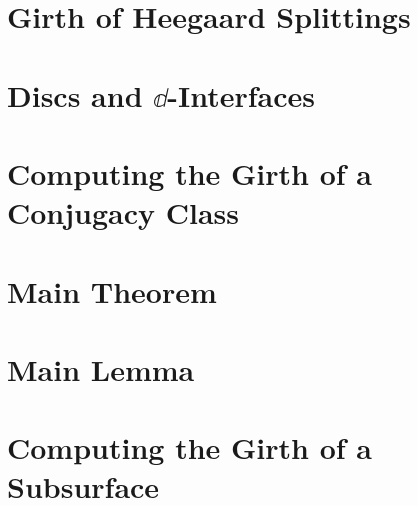 \documentclass[12pt, oneside]{amsart}
\begin{document}
\section{Girth of Heegaard Splittings}
\label{heegaardgirth}


\section{Discs and $\dd$-Interfaces}
\label{subordination}


\section{Computing the Girth of a Conjugacy Class}
\label{curvealgorithm}
\label{computecurve}


\section{Main Theorem}
\label{maintheorem}


\section{Main Lemma}
\label{mainlemma}


\section{Computing the Girth of a Subsurface}
\label{surfacealgorithm}
\label{computesurface}


\clearpage

\renewcommand{\baselinestretch}{1.6}\small\normalsize


\end{document}
